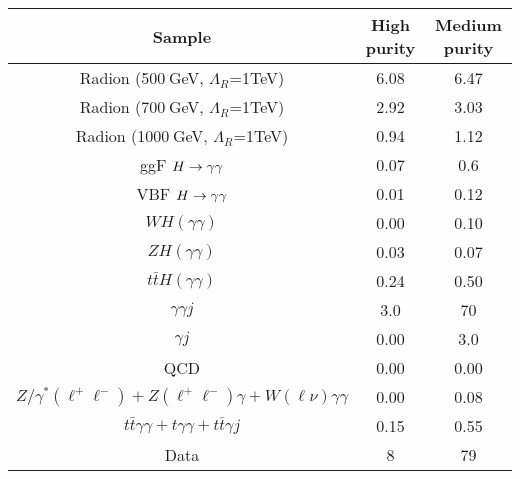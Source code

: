 \begin{tabular}{|c|c|c|}
\hline
Sample & High purity & Medium purity\\
\hline
Radion (500$~$GeV, $\Lambda_R$=1TeV)        &  6.08  & 6.47     \\
Radion (700$~$GeV, $\Lambda_R$=1TeV)        &  2.92  & 3.03     \\
Radion (1000$~$GeV, $\Lambda_R$=1TeV)       &  0.94  & 1.12     \\
\hline
ggF $H\to\gamma\gamma$                &  0.07  &  0.6  \\
VBF $H\to\gamma\gamma$                &  0.01  &  0.12 \\
$WH(\gamma\gamma)$        &  0.00  &  0.10 \\
$ZH(\gamma\gamma)$        &  0.03  &  0.07 \\
$t\bar{t}H(\gamma\gamma)$ &  0.24  &  0.50 \\
\hline
$\gamma\gamma j$                      & 3.0  &  70   \\
$\gamma j$                            & 0.00 &  3.0  \\
QCD                                   & 0.00 &  0.00 \\
$Z/\gamma^*(\ell^+\ell^-) + Z(\ell^+\ell^-)\gamma + W(\ell\nu)\gamma\gamma$ & 0.00 &  0.08 \\
$t\bar{t}\gamma\gamma + t\gamma\gamma + t\bar{t}\gamma j$ & 0.15 &  0.55 \\
\hline
Data                                  & 8 & 79 \\
\hline
\end{tabular}
